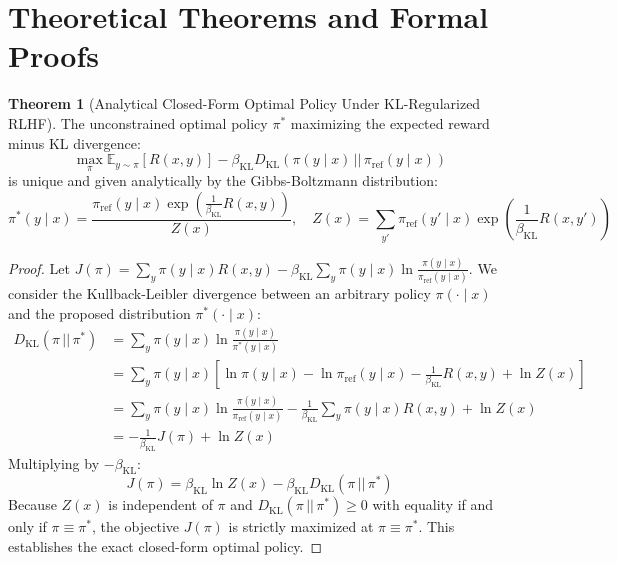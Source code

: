 \documentclass[11pt,a4paper]{article}
\theoremstyle{definition}
\newtheorem{theorem}{\textbf{Theorem}}[section]
\begin{document}
\section{Theoretical Theorems and Formal Proofs}

\begin{theorem}[Analytical Closed-Form Optimal Policy Under KL-Regularized RLHF]
The unconstrained optimal policy $\pi^*$ maximizing the expected reward minus KL divergence:
{\boldmath
\begin{equation}
\max_\pi \mathbb{E}_{y \sim \pi}[R(x, y)] - \beta_{\text{KL}} D_{\text{KL}}(\pi(y \mid x) \,||\, \pi_{\text{ref}}(y \mid x))
\end{equation}
}
is unique and given analytically by the Gibbs-Boltzmann distribution:
{\boldmath
\begin{equation}
\pi^*(y \mid x) = \frac{\pi_{\text{ref}}(y \mid x) \exp\left( \frac{1}{\beta_{\text{KL}}} R(x, y) \right)}{Z(x)}, \quad Z(x) = \sum_{y'} \pi_{\text{ref}}(y' \mid x) \exp\left( \frac{1}{\beta_{\text{KL}}} R(x, y') \right)
\end{equation}
}
\end{theorem}

\begin{proof}
Let $J(\pi) = \sum_y \pi(y \mid x) R(x, y) - \beta_{\text{KL}} \sum_y \pi(y \mid x) \ln \frac{\pi(y \mid x)}{\pi_{\text{ref}}(y \mid x)}$.
We consider the Kullback-Leibler divergence between an arbitrary policy $\pi(\cdot \mid x)$ and the proposed distribution $\pi^*(\cdot \mid x)$:
{\boldmath
\begin{align}
D_{\text{KL}}(\pi \,||\, \pi^*) &= \sum_y \pi(y \mid x) \ln \frac{\pi(y \mid x)}{\pi^*(y \mid x)} \\
&= \sum_y \pi(y \mid x) \left[ \ln \pi(y \mid x) - \ln \pi_{\text{ref}}(y \mid x) - \frac{1}{\beta_{\text{KL}}} R(x, y) + \ln Z(x) \right] \\
&= \sum_y \pi(y \mid x) \ln \frac{\pi(y \mid x)}{\pi_{\text{ref}}(y \mid x)} - \frac{1}{\beta_{\text{KL}}} \sum_y \pi(y \mid x) R(x, y) + \ln Z(x) \\
&= -\frac{1}{\beta_{\text{KL}}} J(\pi) + \ln Z(x)
\end{align}
}
Multiplying by $-\beta_{\text{KL}}$:
{\boldmath
\begin{equation}
J(\pi) = \beta_{\text{KL}} \ln Z(x) - \beta_{\text{KL}} D_{\text{KL}}(\pi \,||\, \pi^*)
\end{equation}
}
Because $Z(x)$ is independent of $\pi$ and $D_{\text{KL}}(\pi \,||\, \pi^*) \ge 0$ with equality if and only if $\pi \equiv \pi^*$, the objective $J(\pi)$ is strictly maximized at $\pi \equiv \pi^*$. This establishes the exact closed-form optimal policy.
\end{proof}
\end{document}

